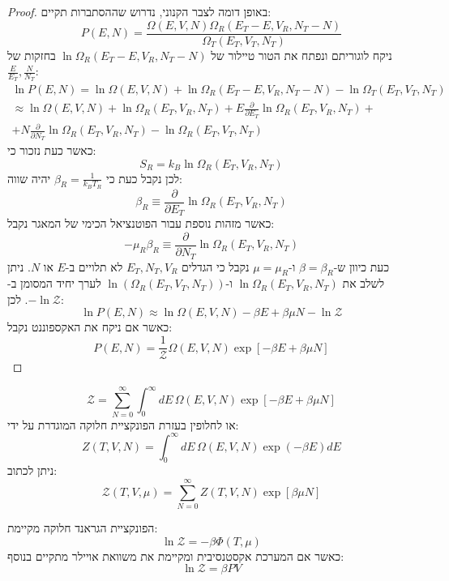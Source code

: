 \documentclass{tstextbook}
\begin{document}
\begin{proof}
באופן דומה לצבר הקנוני, נדרוש שההסתברות תקיים:
$$P(E,N)=\frac{\Omega(E,V,N)\Omega_{R}(E_{T}-E,V_{R},N_{T}-N)}{\Omega_{T}(E_{T},V_{T},N_{T})}$$
ניקח לוגוריתם ונפתח את הטור טיילור של \(\ln \Omega_{R}(E_{T}-E, V_{R},N_{T}-N)\) בחזקות של \(\frac{E}{E_{T}},\frac{N}{N_{T}}\):
\begin{gather*}\ln P(E,N)=\ln\Omega(E,V,N)+\ln\Omega_{R}(E_{T}-E,V_{R},N_{T}-N)-\ln\Omega_{T}(E_{T},V_{T},N_{T})  \\\approx\ln\Omega(E,V,N)+\ln\Omega_{R}(E_{T},V_{R},N_{T})+E\frac{\partial}{\partial E_{T}}\ln\Omega_{R}(E_{T},V_{R},N_{T})+ \\+N\frac{\partial}{\partial N_{T}}\ln\Omega_{R}(E_{T},V_{R},N_{T})-\ln\Omega_{R}(E_{T},V_{T},N_{T})
\end{gather*}
כאשר כעת נזכור כי:
$$S_{R}=k_{B}\ln\Omega_{R}(E_{T},V_{R},N_{T})$$
לכן נקבל כעת כי \(\beta_{R}=\frac{1}{k_{B}T_{R}}\) יהיה שווה:
$$\beta_{R}\equiv\frac{\partial}{\partial E_{T}}\ln\Omega_{R}(E_{T},V_{R},N_{T})$$
כאשר מזהות נוספת עבור הפוטנציאל הכימי של המאגר נקבל:
$$-\mu_{R}\beta_{R}\equiv\frac{\partial}{\partial N_{T}}\ln\Omega_{R}(E_{T},V_{R},N_{T})$$
כעת כיוון ש-\(\beta=\beta_{R}\) ו-\(\mu=\mu_{R}\) נקבל כי הגדלים \(E_{T},N_{T},V_{R}\) לא תלויים ב-\(E\) או \(N\). ניתן לשלב את \(\ln \Omega_{R}(E_{T},V_{R},N_{T})\) ו-\(\ln\left( \Omega_{R}(E_{T}, V_{T},N_{T}) \right)\) לערך יחיד המסומן ב-\(-\ln \mathcal{Z}\). לכן:
$$\ln P(E,N)\approx\ln\Omega(E,V,N)-\beta E+\beta\mu N-\ln{\mathcal{Z}}$$
כאשר אם ניקח את האקספוננט נקבל:
$$P(E,N)=\frac{1}{\mathcal{Z}}\Omega(E,V,N)\exp\left[-\beta E+\beta\mu N\right]$$

\end{proof}
\begin{corollary}
$${\mathcal{Z}}=\sum_{N=0}^{\infty}\int_{0}^{\infty}d E\,\Omega(E,V,N)\exp\left[-\beta E+\beta\mu N\right]$$
או לחלופין בעזרת הפונקציית חלוקה המוגדרת על ידי:
$$Z(T,V,N)=\int_{0}^{\infty}d E\,\Omega(E,V,N)\exp(-\beta E)d E$$
ניתן לכתוב:
$${\mathcal{Z}}(T,V,\mu)=\sum_{N=0}^{\infty}Z(T,V,N)\exp\left[\beta\mu N\right]$$

\end{corollary}
\begin{proposition}
הפונקציית הגראנד חלוקה מקיימת:
$$\ln \mathcal{Z} = -\beta \Phi\left( T,\mu \right)$$
כאשר אם המערכת אקסטנסיבית ומקיימת את משוואת אויילר מתקיים בנוסף:
$$\ln \mathcal{Z} = \beta PV$$

\end{proposition}
\end{document}
